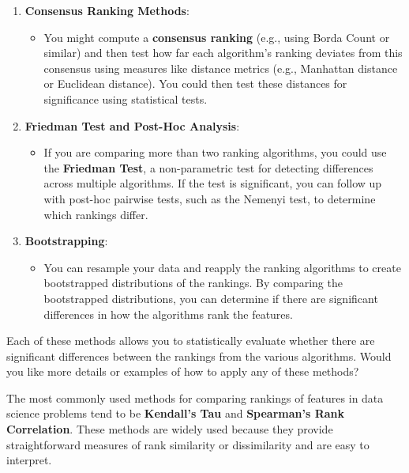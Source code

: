 \documentclass{article}
\begin{document}
\begin{enumerate}
    \item \textbf{Consensus Ranking Methods}:  
    \begin{itemize}
        \item You might compute a \textbf{consensus ranking} (e.g., using Borda Count or similar) and then test how far each algorithm's ranking deviates from this consensus using measures like distance metrics (e.g., Manhattan distance or Euclidean distance). You could then test these distances for significance using statistical tests.
    \end{itemize}

    \item \textbf{Friedman Test and Post-Hoc Analysis}:  
    \begin{itemize}
        \item If you are comparing more than two ranking algorithms, you could use the \textbf{Friedman Test}, a non-parametric test for detecting differences across multiple algorithms. If the test is significant, you can follow up with post-hoc pairwise tests, such as the Nemenyi test, to determine which rankings differ.
    \end{itemize}

    \item \textbf{Bootstrapping}:  
    \begin{itemize}
        \item You can resample your data and reapply the ranking algorithms to create bootstrapped distributions of the rankings. By comparing the bootstrapped distributions, you can determine if there are significant differences in how the algorithms rank the features.
    \end{itemize}
\end{enumerate}

Each of these methods allows you to statistically evaluate whether there are significant differences between the rankings from the various algorithms. Would you like more details or examples of how to apply any of these methods?

The most commonly used methods for comparing rankings of features in data science problems tend to be \textbf{Kendall's Tau} and \textbf{Spearman's Rank Correlation}. These methods are widely used because they provide straightforward measures of rank similarity or dissimilarity and are easy to interpret.
\end{document}
